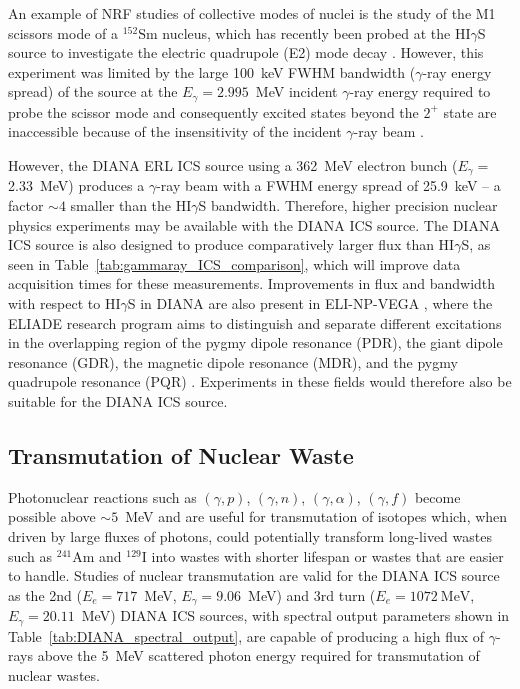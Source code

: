 \documentclass[../main.tex]{subfiles}
\begin{document}
An example of NRF studies of collective modes of nuclei is the study of the M1 scissors mode of a $^{152}\textrm{Sm}$ nucleus, which has recently been probed at the HI$\gamma$S source to investigate the electric quadrupole (E2) mode decay \cite{ide20212}. However, this experiment was limited by the large 100~\si{\kilo\electronvolt} FWHM bandwidth ($\gamma$-ray energy spread) \cite{ide20212} of the source at the $E_{\gamma} = 2.995$~\si{\mega\electronvolt} incident $\gamma$-ray energy required to probe the scissor mode \cite{ziegler1993low} and consequently excited states beyond the $2^{+}$ state are inaccessible because of the insensitivity of the incident $\gamma$-ray beam \cite{ide20212}.

However, the DIANA ERL ICS source using a 362~\si{\mega\electronvolt} electron bunch ($E_{\gamma} =$ 2.33~\si{\mega\electronvolt}) produces a $\gamma$-ray beam with a FWHM energy spread of 25.9~\si{\kilo\electronvolt} -- a factor $\sim4$ smaller than the HI$\gamma$S bandwidth. Therefore, higher precision nuclear physics experiments may be available with the DIANA ICS source. The DIANA ICS source is also designed to produce comparatively larger flux than HI$\gamma$S, as seen in Table~\ref{tab:gammaray_ICS_comparison}, which will improve data acquisition times for these measurements. Improvements in flux and bandwidth with respect to HI$\gamma$S \cite{weller2009research} in DIANA are also present in ELI-NP-VEGA \cite{elinp2019vega}, where the ELIADE research program aims to distinguish and separate different excitations in the overlapping region of the pygmy dipole resonance (PDR), the giant dipole resonance (GDR), the magnetic dipole resonance (MDR), and the pygmy quadrupole resonance (PQR) \cite{tanaka2020current}. Experiments in these fields would therefore also be suitable for the DIANA ICS source.

\subsection{Transmutation of Nuclear Waste}

Photonuclear reactions such as $(\gamma,p)$, $(\gamma,n)$, $(\gamma,\alpha)$, $(\gamma,f)$ become possible above $\sim5$~\si{\mega\electronvolt}  and are useful for transmutation of isotopes which, when driven by large fluxes of photons, could potentially transform long-lived wastes such as $^{241}\mathrm{Am}$ and $^{129}\mathrm{I}$ \cite{cho2016reconsideration} into wastes with shorter lifespan or wastes that are easier to handle. Studies of nuclear transmutation are valid for the DIANA ICS source as the 2nd ($E_{e}=717$~\si{\mega\electronvolt}, $E_{\gamma}=9.06$~\si{\mega\electronvolt}) and 3rd turn ($E_{e}=1072~\si{\mega\electronvolt}$, $E_{\gamma}=20.11$~\si{\mega\electronvolt}) DIANA ICS sources, with spectral output parameters shown in Table~\ref{tab:DIANA_spectral_output}, are capable of producing a high flux of $\gamma$-rays above the 5~\si{\mega\electronvolt} scattered photon energy required for transmutation of nuclear wastes.
\end{document}
